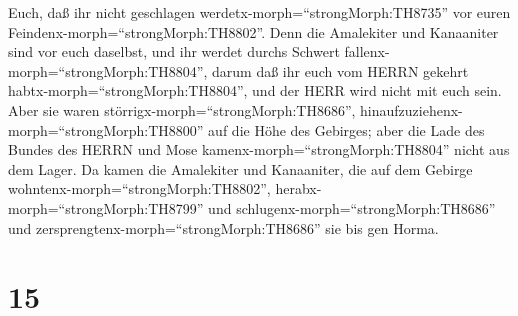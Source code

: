 Euch, daß ihr nicht geschlagen werdetx-morph=``strongMorph:TH8735'' vor
euren Feindenx-morph=``strongMorph:TH8802''.  Denn die
Amalekiter und Kanaaniter sind vor euch daselbst, und ihr werdet durchs
Schwert fallenx-morph=``strongMorph:TH8804'', darum daß ihr euch vom
HERRN gekehrt habtx-morph=``strongMorph:TH8804'', und der HERR wird
nicht mit euch sein.  Aber sie waren
störrigx-morph=``strongMorph:TH8686'',
hinaufzuziehenx-morph=``strongMorph:TH8800'' auf die Höhe des Gebirges;
aber die Lade des Bundes des HERRN und Mose
kamenx-morph=``strongMorph:TH8804'' nicht aus dem Lager. 
Da kamen die Amalekiter und Kanaaniter, die auf dem Gebirge
wohntenx-morph=``strongMorph:TH8802'',
herabx-morph=``strongMorph:TH8799'' und
schlugenx-morph=``strongMorph:TH8686'' und
zersprengtenx-morph=``strongMorph:TH8686'' sie bis gen Horma.

\hypertarget{section-14}{%
\section{15}\label{section-14}}

